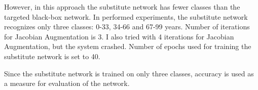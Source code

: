 However, in this approach the substitute network has fewer classes than the targeted black-box network. In performed experiments, the substitute network recognizes only three classes: 0-33, 34-66 and 67-99 years. Number of iterations for Jacobian Augmentation is 3. I also tried with 4 iterations for Jacobian Augmentation, but the system crashed. Number of epochs used for training the substitute network is set to 40.

Since the substitute network is trained on only three classes, accuracy is used as a measure for evaluation of the network.

